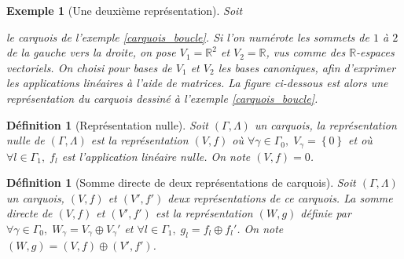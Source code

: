 \documentclass[a4paper,11pt]{article}
\newtheorem{defi}[thm]{Définition}%
\newtheorem{ex}[thm]{Exemple}%
\begin{document}
\begin{ex}[Une deuxième représentation]
	Soit
		le carquois de l'exemple \ref{carquois_boucle}. Si l'on numérote les sommets de $1$ à $2$ de la gauche vers la droite, on pose $V_1=\mathbb R^2$ et $V_2=\mathbb R$, vus comme des $\mathbb R$-espaces vectoriels. On choisi pour bases de $V_1$ et $V_2$ les bases canoniques, afin d'exprimer les applications linéaires à l'aide de matrices. La figure ci-dessous est alors une représentation du carquois dessiné à l'exemple \ref{carquois_boucle}.
		\begin{center}
	\end{center}

\end{ex}
\begin{defi}[Représentation nulle]
	Soit $(\Gamma,\Lambda)$ un carquois, la \emph{représentation nulle} de $(\Gamma,\Lambda)$ est la représentation $(V,f)$ où $\forall\gamma\in\Gamma_{0},\;V_{\gamma}=\left\{ 0 \right\}$ et où $\forall l \in\Gamma_{1},\;f_{l}$ est l'application linéaire nulle. On note $(V,f)=0$.
\end{defi}
\begin{defi}[Somme directe de deux représentations de carquois]
	Soit $(\Gamma,\Lambda)$ un carquois, $(V,f)$ et $(V',f')$ deux représentations de ce carquois. La \emph{somme directe} de $(V,f)$ et $(V',f')$ est la représentation $(W,g)$ définie par $\forall\gamma\in\Gamma_{0},\;W_{\gamma}=V_{\gamma}\oplus V_{\gamma}'$ et $\forall l \in\Gamma_{1},\;g_{l}=f_{l}\oplus f_{l}'$. On note $(W,g)=(V,f)\oplus (V',f')$.
\end{defi}
\end{document}
